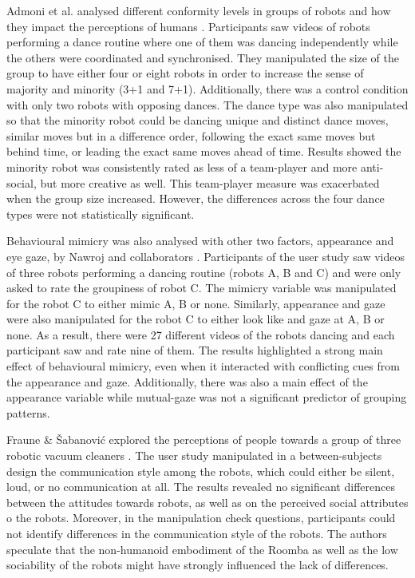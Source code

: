 Admoni et al. analysed different conformity levels in groups of robots and how they impact the perceptions of humans \cite{admoni2013dancing}. Participants saw videos of robots performing a dance routine where one of them was dancing independently while the others were coordinated and synchronised. They manipulated the size of the group to have either four or eight robots in order to increase the sense of majority and minority (3+1 and 7+1). Additionally, there was a control condition with only two robots with opposing dances. The dance type was also manipulated so that the minority robot could be dancing unique and distinct dance moves, similar moves but in a difference order, following the exact same moves but behind time, or leading the exact same moves ahead of time. Results showed the minority robot was consistently rated as less of a team-player and more anti-social, but more creative as well. This team-player measure was exacerbated when the group size increased. However, the differences across the four dance types were not statistically significant.

Behavioural mimicry was also analysed with other two factors, appearance and eye gaze, by Nawroj and collaborators \cite{nawroj2014exploration}. Participants of the user study saw videos of three robots performing a dancing routine (robots A, B and C) and were only asked to rate the groupiness of robot C. The mimicry variable was manipulated for the robot C to either mimic A, B or none. Similarly, appearance and gaze were also manipulated for the robot C to either look like and gaze at A, B or none. As a result, there were 27 different videos of the robots dancing and each participant saw and rate nine of them. The results highlighted a strong main effect of behavioural mimicry, even when it interacted with conflicting cues from the appearance and gaze. Additionally, there was also a main effect of the appearance variable while mutual-gaze was not a significant predictor of grouping patterns.

Fraune \& {\v{S}}abanovi{\'c} explored the perceptions of people towards a group of three robotic vacuum cleaners \cite{fraune2014negative}. The user study manipulated in a between-subjects design the communication style among the robots, which could either be silent, loud, or no communication at all. The results revealed no significant differences between the attitudes towards robots, as well as on the perceived social attributes o the robots. Moreover, in the manipulation check questions, participants could not identify differences in the communication style of the robots. The authors speculate that the non-humanoid embodiment of the Roomba as well as the low sociability of the robots might have strongly influenced the lack of differences.

